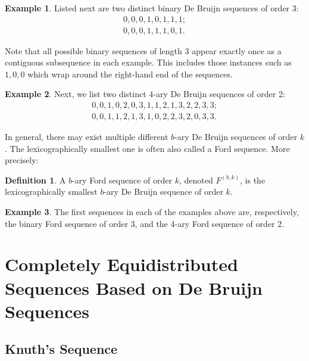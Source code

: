\documentclass[11pt,a4paper]{tesis}
\theoremstyle{plain}
\theoremstyle{definition}
\newtheorem*{definition*}{Definition}
\newtheorem*{exmp*}{Example}
\begin{document}
\begin{exmp*}
  Listed next are two distinct binary De Bruijn sequences of order 3:
  \begin{equation*}
    \begin{aligned}
      0, 0, 0, 1, 0, 1, 1, 1; \\
      0, 0, 0, 1, 1, 1, 0, 1.
    \end{aligned}
  \end{equation*}
\end{exmp*}

Note that all possible binary sequences of length 3 appear exactly once as a contiguous subsequence in each example. This includes those instances such as $1, 0, 0$ which wrap around the right-hand end of the sequences.

\begin{exmp*}
  Next, we list two distinct 4-ary De Bruijn sequences of order 2:
  \begin{equation*}
    \begin{aligned}
      0, 0, 1, 0, 2, 0, 3, 1, 1, 2, 1, 3, 2, 2, 3, 3; \\
      0, 0, 1, 1, 2, 1, 3, 1, 0, 2, 2, 3, 2, 0, 3, 3.
    \end{aligned}
  \end{equation*}  
\end{exmp*}

In general, there may exist multiple different $b$-ary De Bruijn sequences of order $k$. The lexicographically smallest one is often also called a Ford sequence. More precisely:

\begin{definition*}
  A $b$-ary Ford sequence of order $k$, denoted $F^{(b, k)}$, is the lexicographically smallest $b$-ary De Bruijn sequence of order $k$.
\end{definition*}

\begin{exmp*}
  The first sequences in each of the examples above are, respectively, the binary Ford sequence of order 3, and the 4-ary Ford sequence of order 2.
\end{exmp*}

\chapter{Completely Equidistributed Sequences Based on De Bruijn Sequences}\label{chapter:cesbofs}

\section{Knuth's Sequence}
\end{document}
